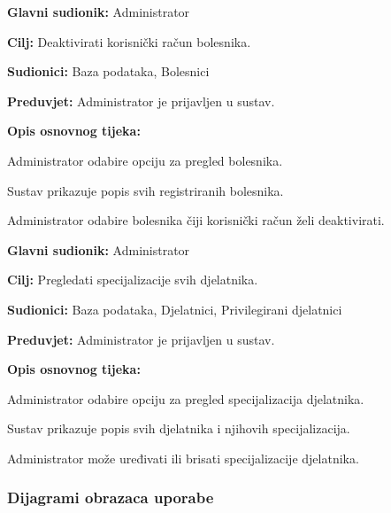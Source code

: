 \vspace{1em} %
\noindent{}
\begin{packed_item}
	\item \textbf{Glavni sudionik:} Administrator
	\item \textbf{Cilj:} Deaktivirati korisnički račun bolesnika.
	\item \textbf{Sudionici:} Baza podataka, Bolesnici
	\item \textbf{Preduvjet:} Administrator je prijavljen u sustav.
	\item \textbf{Opis osnovnog tijeka:}
	\begin{packed_enum}
		\item Administrator odabire opciju za pregled bolesnika.
		\item Sustav prikazuje popis svih registriranih bolesnika.
		\item Administrator odabire bolesnika čiji korisnički račun želi deaktivirati.
	\end{packed_enum}
\end{packed_item}

\vspace{1em} %
\noindent{}
\begin{packed_item}
	\item \textbf{Glavni sudionik:} Administrator
	\item \textbf{Cilj:} Pregledati specijalizacije svih djelatnika.
	\item \textbf{Sudionici:} Baza podataka, Djelatnici, Privilegirani djelatnici
	\item \textbf{Preduvjet:} Administrator je prijavljen u sustav.
	\item \textbf{Opis osnovnog tijeka:}
	\begin{packed_enum}
		\item Administrator odabire opciju za pregled specijalizacija djelatnika.
		\item Sustav prikazuje popis svih djelatnika i njihovih specijalizacija.
		\item Administrator može uređivati ili brisati specijalizacije djelatnika.
	\end{packed_enum}
\end{packed_item}

\subsubsection{Dijagrami obrazaca uporabe}

